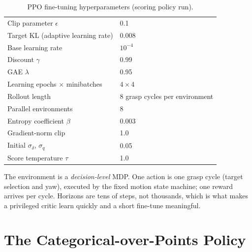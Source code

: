 \begin{table}[t]
\centering
\caption{PPO fine-tuning hyperparameters (scoring policy run).}
\label{tab:rl_hyperparams}
\begin{tabular}{ll}
\hline
Clip parameter $\epsilon$ & 0.1 \\
Target KL (adaptive learning rate) & 0.008 \\
Base learning rate & $10^{-4}$ \\
Discount $\gamma$ & 0.99 \\
GAE $\lambda$ & 0.95 \\
Learning epochs $\times$ minibatches & $4 \times 4$ \\
Rollout length & 8 grasp cycles per environment \\
Parallel environments & 8 \\
Entropy coefficient $\beta$ & 0.003 \\
Gradient-norm clip & 1.0 \\
Initial $\sigma_\delta$, $\sigma_q$ & 0.05 \\
Score temperature $\tau$ & 1.0 \\
\hline
\end{tabular}
\end{table}

The environment is a \emph{decision-level} MDP. One action is one grasp cycle (target selection
and yaw), executed by the fixed motion state machine; one reward arrives per
cycle. Horizons are tens of steps, not thousands, which is what makes a
privileged critic learn quickly and a short fine-tune meaningful.

\section{The Categorical-over-Points Policy}
\label{sec:rl_scoring_ac}

